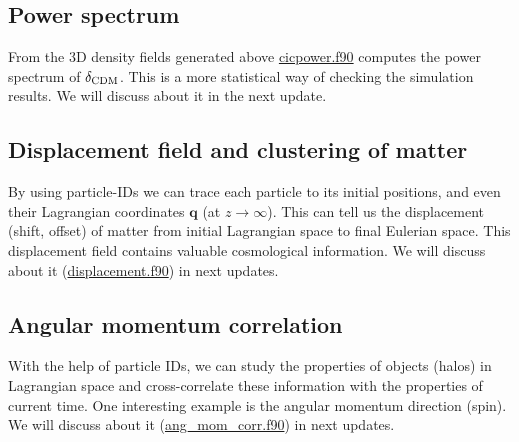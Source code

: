 \documentclass[12pt]{article}
\newcommand{\bs}{\boldsymbol}
\newcommand{\tcx}{\textcolor{teal}}
\begin{document}
\subsection{Power spectrum}
From the 3D density fields generated above \url{cicpower.f90} computes the power spectrum of $\delta_{\rm CDM}$. This is a more statistical way of checking the simulation results. We will discuss about it in the next update.

\subsection{Displacement field and clustering of matter}
By using particle-IDs we can trace each particle to its initial positions, and even their Lagrangian coordinates $\bs{q}$ (at $z\rightarrow\infty$). This can tell us the displacement (shift, offset) of matter from initial Lagrangian space to final Eulerian space. This displacement field contains valuable cosmological information. We will discuss about it (\url{displacement.f90}) in next updates.

\subsection{Angular momentum correlation}
With the help of particle IDs, we can study the properties of objects (halos) in Lagrangian space and cross-correlate these information with the properties of current time. One interesting example is the angular momentum direction (spin). We will discuss about it (\url{ang_mom_corr.f90}) in next updates.





\end{document}
